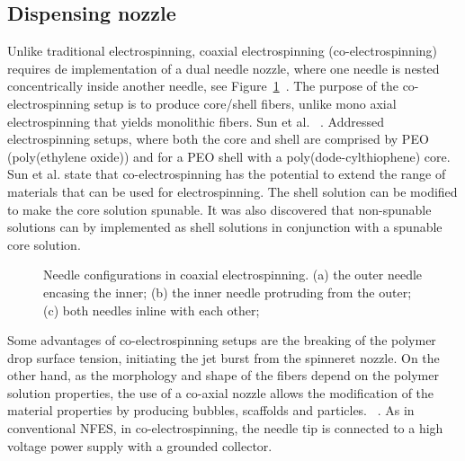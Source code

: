 \subsection{Dispensing nozzle}Unlike traditional electrospinning, coaxial electrospinning (co-electrospinning) requires de implementation of a dual needle nozzle, where one needle is nested concentrically inside another needle, see Figure~\ref{f-4a5ffd16c3ab}\unskip~\cite{527120:13914792,527120:13914793}. The purpose of the co-electrospinning setup is to produce core/shell fibers, unlike mono axial electrospinning that yields monolithic fibers. Sun et al. \unskip~\cite{527120:13914312}. Addressed electrospinning setups, where both the core and shell are comprised by PEO (poly(ethylene oxide)) and for a PEO shell with a poly(dode-cylthiophene) core. Sun et al. state that co-electrospinning has the potential to extend the range of materials that can be used for electrospinning. The shell solution can be modified to make the core solution spunable. It was also discovered that non-spunable solutions can by implemented as shell solutions in conjunction with a spunable core solution. \unskip~\cite{527120:13914968}


\bgroup
\begin{figure}[!htbp]
\centering \makeatletter{}
\makeatother 
\caption{{Needle configurations in coaxial electrospinning. (a) the outer needle encasing the inner; (b) the inner needle protruding from the outer; (c) both needles inline with each other;}}
\label{f-4a5ffd16c3ab}
\end{figure}
\egroup
Some advantages of co-electrospinning setups are the breaking of the polymer drop surface tension, initiating the jet burst from the spinneret nozzle. On the other hand, as the morphology and shape of the fibers depend on the polymer solution properties, the use of a co-axial nozzle allows the modification of the material properties by producing bubbles, scaffolds and particles. \unskip~\cite{527120:13914748,527120:13914750}. As in conventional NFES, in co-electrospinning, the needle tip is connected to a high voltage power supply with a grounded collector.



